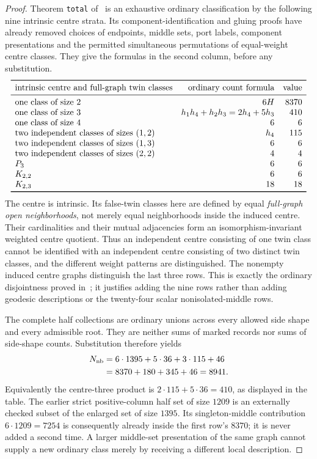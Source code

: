 \documentclass[11pt]{article}
\begin{document}
\begin{proof}
Theorem \texttt{total} of~\cite{reduction} is an exhaustive ordinary
classification by the following nine intrinsic centre strata. Its
component-identification and gluing proofs have already removed choices
of endpoints, middle sets, port labels, component presentations and the
permitted simultaneous permutations of equal-weight centre classes.
They give the formulas in the second column, before any substitution.
\[
\begin{array}{lrr}
\toprule
\text{intrinsic centre and full-graph twin classes}&
 \text{ordinary count formula}&\text{value}\\
\midrule
\text{one class of size }2&6H&8370\\
\text{one class of size }3&h_1h_4+h_2h_3=2h_4+5h_3&410\\
\text{one class of size }4&6&6\\
\text{two independent classes of sizes }(1,2)&h_4&115\\
\text{two independent classes of sizes }(1,3)&6&6\\
\text{two independent classes of sizes }(2,2)&4&4\\
P_3&6&6\\
K_{2,2}&6&6\\
K_{2,3}&18&18\\
\bottomrule
\end{array}
\]
The centre is intrinsic. Its false-twin classes here are defined by equal
\emph{full-graph open neighborhoods}, not merely equal neighborhoods
inside the induced centre. Their cardinalities and their mutual
adjacencies form an isomorphism-invariant weighted centre quotient.
Thus an independent centre consisting of one twin class cannot be
identified with an independent centre consisting of two distinct twin
classes, and the different weight patterns are distinguished. The
nonempty induced centre graphs distinguish the last three rows. This
is exactly the ordinary disjointness proved in~\cite{reduction}; it
justifies adding the nine rows rather than adding geodesic descriptions
or the twenty-four scalar nonisolated-middle rows.

The complete half collections are ordinary unions across every allowed
side shape and every admissible root. They are neither sums of marked
records nor sums of side-shape counts. Substitution therefore yields
\[
\begin{split}
 N_{\rm nb}
 &=6\cdot1395+5\cdot36+3\cdot115+46\\
 &=8370+180+345+46=8941.
\end{split}
\]
Equivalently the centre-three product is
$2\cdot115+5\cdot36=410$, as displayed in the table.
The earlier strict positive-column half set of size $1209$ is an
externally checked subset of the enlarged set of size $1395$. Its
singleton-middle contribution $6\cdot1209=7254$ is consequently already
inside the first row's $8370$; it is never added a second time. A larger
middle-set presentation of the same graph cannot supply a new ordinary
class merely by receiving a different local description.


\end{proof}
\end{document}
